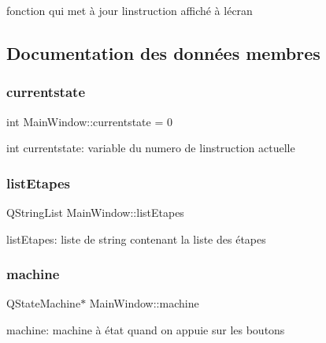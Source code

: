 fonction qui met à jour l\textquotesingle{}instruction affiché à l\textquotesingle{}écran 



\subsection{Documentation des données membres}
\mbox{\label{classMainWindow_aa7fb75eed49d7eaa019f64577fa11b05}} 
\subsubsection{\texorpdfstring{currentstate}{currentstate}}
{\footnotesize\ttfamily int Main\+Window\+::currentstate = 0\hspace{0.3cm}{\ttfamily [private]}}

int currentstate\+: variable du numero de l\textquotesingle{}instruction actuelle \mbox{\label{classMainWindow_a1290f4c9df65fb27c870753aa2b24a88}} 
\subsubsection{\texorpdfstring{list\+Etapes}{listEtapes}}
{\footnotesize\ttfamily Q\+String\+List Main\+Window\+::list\+Etapes\hspace{0.3cm}{\ttfamily [private]}}

list\+Etapes\+: liste de string contenant la liste des étapes \mbox{\label{classMainWindow_af5f0afb6c5f81e4438f98f93f918ea8b}} 
\subsubsection{\texorpdfstring{machine}{machine}}
{\footnotesize\ttfamily Q\+State\+Machine$\ast$ Main\+Window\+::machine\hspace{0.3cm}{\ttfamily [private]}}

machine\+: machine à état quand on appuie sur les boutons \mbox{\label{classMainWindow_a35466a70ed47252a0191168126a352a5}} 
